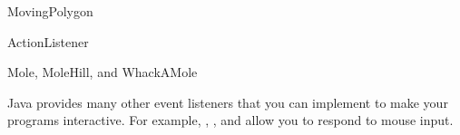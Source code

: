 \begin{exercise}
MovingPolygon
\end{exercise}


\begin{exercise}
ActionListener
\end{exercise}

\begin{exercise}
Mole, MoleHill, and WhackAMole

Java provides many other event listeners that you can implement to make your programs interactive.
For example, , , and  allow you to respond to mouse input.
\end{exercise}
